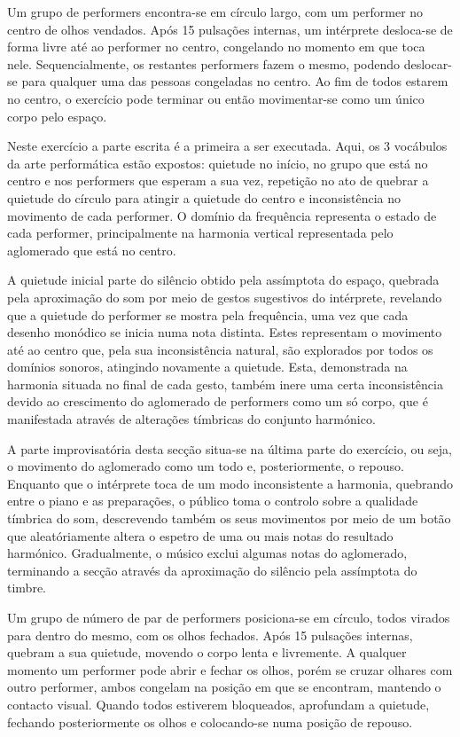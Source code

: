 \documentclass[../main.tex]{subfiles}
\begin{document}
\begin{performex}
    Um grupo de performers encontra-se em círculo largo, com um performer no centro de olhos vendados. Após 15 pulsações internas, um intérprete desloca-se de forma livre até ao performer no centro, congelando no momento em que toca nele. Sequencialmente, os restantes performers fazem o mesmo, podendo deslocar-se para qualquer uma das pessoas congeladas no centro. Ao fim de todos estarem no centro, o exercício pode terminar ou então movimentar-se como um único corpo pelo espaço.
\end{performex}

Neste exercício a parte escrita é a primeira a ser executada. Aqui, os 3 vocábulos da arte performática estão expostos: quietude no início, no grupo que está no centro e nos performers que esperam a sua vez, repetição no ato de quebrar a quietude do círculo para atingir a quietude do centro e inconsistência no movimento de cada performer. O domínio da frequência representa o estado de cada performer, principalmente na harmonia vertical representada pelo aglomerado que está no centro. 

A quietude inicial parte do silêncio obtido pela assímptota do espaço, quebrada pela aproximação do som por meio de gestos sugestivos do intérprete, revelando que a quietude do performer se mostra pela frequência, uma vez que cada desenho monódico se inicia numa nota distinta. Estes representam o movimento até ao centro que, pela sua inconsistência natural, são explorados por todos os domínios sonoros, atingindo novamente a quietude. Esta, demonstrada na harmonia situada no final de cada gesto, também inere uma certa inconsistência devido ao crescimento do aglomerado de performers como um só corpo, que é manifestada através de alterações tímbricas do conjunto harmónico.

A parte improvisatória desta secção situa-se na última parte do exercício, ou seja, o movimento do aglomerado como um todo e, posteriormente, o repouso. Enquanto que o intérprete toca de um modo inconsistente a harmonia, quebrando entre o piano e as preparações, o público toma o controlo sobre a qualidade tímbrica do som, descrevendo também os seus movimentos por meio de um botão que aleatóriamente altera o espetro de uma ou mais notas do resultado harmónico. Gradualmente, o músico exclui algumas notas do aglomerado, terminando a secção através da aproximação do silêncio pela assímptota do timbre.

\begin{performex}
    Um grupo de número de par de performers posiciona-se em círculo, todos virados para dentro do mesmo, com os olhos fechados. Após 15 pulsações internas, quebram a sua quietude, movendo o corpo lenta e livremente. A qualquer momento um performer pode abrir e fechar os olhos, porém se cruzar olhares com outro performer, ambos congelam na posição em que se encontram, mantendo o contacto visual. Quando todos estiverem bloqueados, aprofundam a quietude, fechando posteriormente os olhos e colocando-se numa posição de repouso.
\end{performex}
\end{document}
